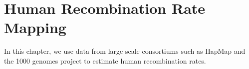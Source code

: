 
\chapter{Human Recombination Rate Mapping}
\label{ch:human_recombination_rate}

In this chapter, we use data from large-scale consortiums such as HapMap and the 1000 genomes project to estimate human recombination rates.

